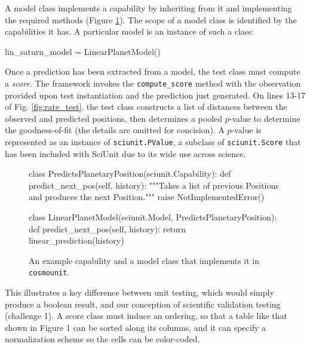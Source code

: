 \documentclass[9pt]{sig-alternate}
\newcommand{\verbx}[1]{\lstinline{#1}}
\begin{document}
A model class implements a capability by inheriting from it and implementing the required methods (Figure \ref{fig:capability}).  The scope of a model class is identified by the capabilities it has. A particular model is an instance of such a class: 
\vspace{-3px}
\begin{python}
lin_saturn_model = LinearPlanetModel()
\end{python}
\vspace{-5px}

Once a prediction has been extracted from a model, the test class must compute a \emph{score}. The framework invokes the \verbx{compute_score} method with the observation provided upon test instantiation and the prediction just generated. On lines 13-17 of Fig. \ref{fig:rate_test}, the test class constructs a list of distances between the observed and predicted positions, then determines a pooled $p$-value to determine the goodness-of-fit (the details are omitted for concision). A $p$-value is represented as an instance of \verbx{sciunit.PValue}, a subclass of \texttt{sciunit.Score} that has been included with {SciUnit} due to its wide use across science. %
\begin{figure}
\small
\begin{python}
class PredictsPlanetaryPosition(sciunit.Capability):
  def predict_next_pos(self, history): 
    """Takes a list of previous Positions and produces the next Position."""
    raise NotImplementedError()

class LinearPlanetModel(sciunit.Model, 
    PredictsPlanetaryPosition):
  def predict_next_pos(self, history):
    return linear_prediction(history)
\end{python}
\vspace{-12px}
\caption{\small An example capability and a model class that implements it in \verbx{cosmounit}.}
\label{fig:capability}
\vspace{-10px}
\end{figure}

This illustrates a key difference between unit testing, which would simply produce a boolean result, and our conception of scientific validation testing (challenge 1). A score class must induce an ordering, so that a table like that shown in Figure 1 can be sorted along its columns, and it can  specify a normalization scheme so the cells can be color-coded.  %
\end{document}
